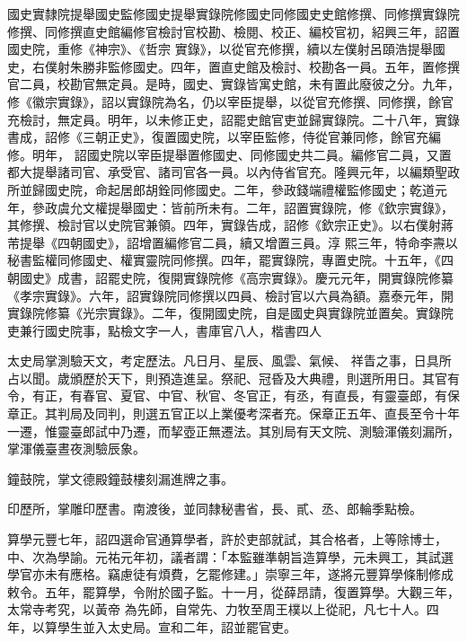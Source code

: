 \begin{pinyinscope}
 國史實隸院提舉國史監修國史提舉實錄院修國史同修國史史館修撰、同修撰實錄院修撰、同修撰直史館編修官檢討官校勘、檢閱、校正、編校官初，紹興三年，詔置國史院，重修《神宗》、《哲宗
 實錄》，以從官充修撰，續以左僕射呂頤浩提舉國史，右僕射朱勝非監修國史。四年，置直史館及檢討、校勘各一員。五年，置修撰官二員，校勘官無定員。是時，國史、實錄皆寓史館，未有置此廢彼之分。九年，修《徽宗實錄》，詔以實錄院為名，仍以宰臣提舉，以從官充修撰、同修撰，餘官充檢討，無定員。明年，以未修正史，詔罷史館官吏並歸實錄院。二十八年，實錄書成，詔修《三朝正史》，復置國史院，以宰臣監修，侍從官兼同修，餘官充編修。明年，
 詔國史院以宰臣提舉置修國史、同修國史共二員。編修官二員，又置都大提舉諸司官、承受官、諸司官各一員。以內侍省官充。隆興元年，以編類聖政所並歸國史院，命起居郎胡銓同修國史。二年，參政錢端禮權監修國史；乾道元年，參政虞允文權提舉國史：皆前所未有。二年，詔置實錄院，修《欽宗實錄》，其修撰、檢討官以史院官兼領。四年，實錄告成，詔修《欽宗正史》。以右僕射蔣芾提舉《四朝國史》，詔增置編修官二員，續又增置三員。淳
 熙三年，特命李燾以秘書監權同修國史、權實靈院同修撰。四年，罷實錄院，專置史院。十五年，《四朝國史》成書，詔罷史院，復開實錄院修《高宗實錄》。慶元元年，開實錄院修纂《孝宗實錄》。六年，詔實錄院同修撰以四員、檢討官以六員為額。嘉泰元年，開實錄院修纂《光宗實錄》。二年，復開國史院，自是國史與實錄院並置矣。實錄院吏兼行國史院事，點檢文字一人，書庫官八人，楷書四人



 太史局掌測驗天文，考定歷法。凡日月、星辰、風雲、氣候、
 祥眚之事，日具所占以聞。歲頒歷於天下，則預造進呈。祭祀、冠昏及大典禮，則選所用日。其官有令，有正，有春官、夏官、中官、秋官、冬官正，有丞，有直長，有靈臺郎，有保章正。其判局及同判，則選五官正以上業優考深者充。保章正五年、直長至令十年一遷，惟靈臺郎試中乃遷，而挈壺正無遷法。其別局有天文院、測驗渾儀刻漏所，掌渾儀臺晝夜測驗辰象。



 鐘鼓院，掌文德殿鐘鼓樓刻漏進牌之事。



 印歷所，掌雕印歷書。南渡後，並同隸秘書省，長、貳、丞、郎輪季點檢。



 算學元豐七年，詔四選命官通算學者，許於吏部就試，其合格者，上等除博士，中、次為學諭。元祐元年初，議者謂：「本監雖準朝旨造算學，元未興工，其試選學官亦未有應格。竊慮徒有煩費，乞罷修建。」崇寧三年，遂將元豐算學條制修成敕令。五年，罷算學，令附於國子監。十一月，從薛昂請，復置算學。大觀三年，太常寺考究，以黃帝
 為先師，自常先、力牧至周王樸以上從祀，凡七十人。四年，以算學生並入太史局。宣和二年，詔並罷官吏。




\end{pinyinscope}
